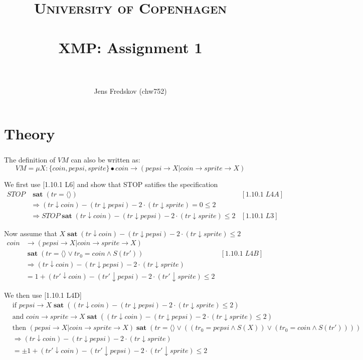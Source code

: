 \documentclass[a4paper, 11pt]{article}
\title{ 
\normalfont \normalsize 
\textsc{University of Copenhagen} \\ [25pt]
\horrule{0.5pt} \\[0.4cm]
\huge XMP: Assignment 1 \\
\horrule{2pt} \\[0.5cm]
}
\author{Jens Fredskov (chw752)}
\def\sat{\mathbf{\;sat\;}}
\begin{document}
\maketitle
\pagebreak
\tableofcontents
\pagebreak

\part{Theory} %
\label{prt:theory_}

\section{} %

The definition of $VM$ can also be written as:
\[
    VM = \mu X : \{ coin, pepsi, sprite\} \bullet coin \rightarrow (pepsi \rightarrow X | coin \rightarrow sprite \rightarrow X)
\]

We first use [1.10.1 L6] and show that STOP satifies the specification
\begin{align*}
STOP & \sat (tr = \langle \rangle) & [1.10.1\;L4A] \\
     & \Rightarrow (tr \downarrow coin) - (tr \downarrow pepsi) - 2 \cdot (tr \downarrow sprite) = 0 \le 2 \\
     & \Rightarrow STOP \sat (tr \downarrow coin) - (tr \downarrow pepsi) - 2 \cdot (tr \downarrow sprite) \le 2 & [1.10.1\;L3]
\end{align*}

Now assume that $X \sat (tr \downarrow coin) - (tr \downarrow pepsi) - 2 \cdot (tr \downarrow sprite) \le 2$
\begin{align*}
coin & \rightarrow (pepsi \rightarrow X | coin \rightarrow sprite \rightarrow X) \\
     & \sat (tr = \langle \rangle \vee tr_0 = coin \wedge S(tr')) & [1.10.1\;L4B] \\
     & \Rightarrow (tr \downarrow coin) - (tr \downarrow pepsi) - 2 \cdot (tr \downarrow sprite) \\
     & = 1 + (tr' \downarrow coin) - (tr' \downarrow pepsi) - 2 \cdot (tr' \downarrow sprite) \le 2
\end{align*}

We then use [1.10.1 L4D]
\begin{align*}
& \text{if } pepsi \rightarrow X \sat ((tr \downarrow coin) - (tr \downarrow pepsi) - 2 \cdot (tr \downarrow sprite) \le 2) \\
& \text{and } coin \rightarrow sprite \rightarrow X \sat ((tr \downarrow coin) - (tr \downarrow pepsi) - 2 \cdot (tr \downarrow sprite) \le 2) \\
& \text{then } (pepsi \rightarrow X | coin \rightarrow sprite \rightarrow X) \sat (tr = \langle \rangle \vee ((tr_0 = pepsi \wedge S(X)) \vee (tr_0 = coin \wedge S(tr')))) \\
& \Rightarrow (tr \downarrow coin) - (tr \downarrow pepsi) - 2 \cdot (tr \downarrow sprite) \\
& = \pm 1 + (tr' \downarrow coin) - (tr' \downarrow pepsi) - 2 \cdot (tr' \downarrow sprite) \le 2
\end{align*}
\end{document}
